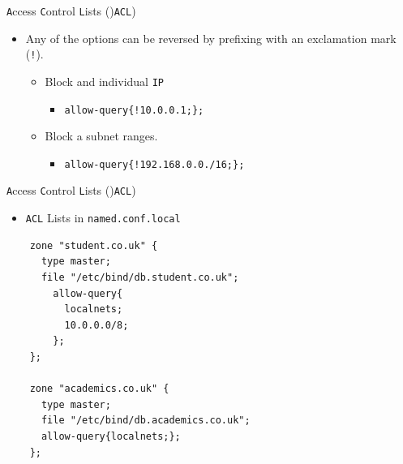 \documentclass[xcolor=table]{beamer}
\begin{document}
\begin{frame}{\texttt{A}ccess \texttt{C}ontrol \texttt{L}ists ()\texttt{ACL})}
  \begin{itemize}
    \item Any of the options can be reversed by prefixing with an exclamation mark (\texttt{!}).
      \begin{itemize}
        \item Block and individual \texttt{IP}
          \begin{itemize}
            \item \texttt{allow-query\{!10.0.0.1;\};}
          \end{itemize}
        \item Block a subnet ranges.
          \begin{itemize}
            \item \texttt{allow-query\{!192.168.0.0./16;\};}
          \end{itemize}
        \end{itemize}
  \end{itemize}
\end{frame}

\begin{frame}[fragile]{\texttt{A}ccess \texttt{C}ontrol \texttt{L}ists ()\texttt{ACL})}
  \begin{itemize}
    \item \texttt{ACL} Lists in \texttt{named.conf.local}
  \end{itemize}
  \lstset{
    basicstyle=\small\ttfamily,
  }
  \begin{lstlisting}
    zone "student.co.uk" {
      type master;
      file "/etc/bind/db.student.co.uk";
        allow-query{
          localnets;
          10.0.0.0/8;
        };
    };
    
    zone "academics.co.uk" {
      type master;
      file "/etc/bind/db.academics.co.uk";
      allow-query{localnets;};
    };
  \end{lstlisting}
\end{frame}
\end{document}

